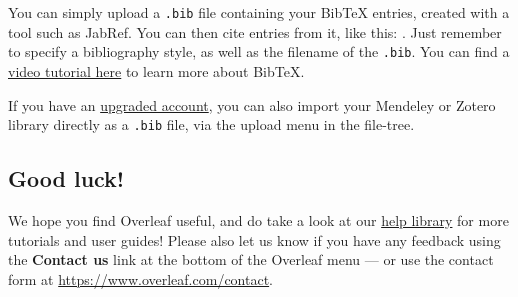 \documentclass[14pt]{extarticle}
\begin{document}
You can simply upload a \verb|.bib| file containing your BibTeX entries, created with a tool such as JabRef. You can then cite entries from it, like this: \cite{greenwade93}. Just remember to specify a bibliography style, as well as the filename of the \verb|.bib|. You can find a \href{https://www.overleaf.com/help/97-how-to-include-a-bibliography-using-bibtex}{video tutorial here} to learn more about BibTeX.

If you have an \href{https://www.overleaf.com/user/subscription/plans}{upgraded account}, you can also import your Mendeley or Zotero library directly as a \verb|.bib| file, via the upload menu in the file-tree.

\subsection{Good luck!}

We hope you find Overleaf useful, and do take a look at our \href{https://www.overleaf.com/learn}{help library} for more tutorials and user guides! Please also let us know if you have any feedback using the \textbf{Contact us} link at the bottom of the Overleaf menu --- or use the contact form at \url{https://www.overleaf.com/contact}.



\end{document}
